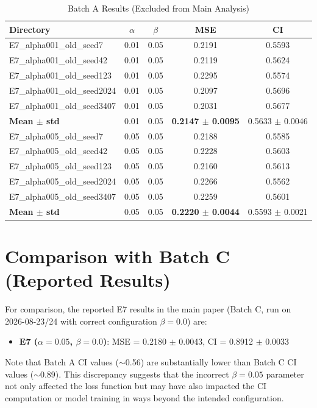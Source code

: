 \documentclass[10pt,a4paper]{article}
\begin{document}
\begin{table}[!h]
\centering
\caption{Batch A Results (Excluded from Main Analysis)}
\label{tab:batch_a}
\begin{tabular}{lcccc}
\hline
\textbf{Directory} & \textbf{$\alpha$} & \textbf{$\beta$} & \textbf{MSE} & \textbf{CI} \\
\hline
E7\_alpha001\_old\_seed7 & 0.01 & 0.05 & 0.2191 & 0.5593 \\
E7\_alpha001\_old\_seed42 & 0.01 & 0.05 & 0.2119 & 0.5624 \\
E7\_alpha001\_old\_seed123 & 0.01 & 0.05 & 0.2295 & 0.5574 \\
E7\_alpha001\_old\_seed2024 & 0.01 & 0.05 & 0.2097 & 0.5696 \\
E7\_alpha001\_old\_seed3407 & 0.01 & 0.05 & 0.2031 & 0.5677 \\
\hline
\textbf{Mean $\pm$ std} & 0.01 & 0.05 & \textbf{0.2147 $\pm$ 0.0095} & 0.5633 $\pm$ 0.0046 \\
\hline
E7\_alpha005\_old\_seed7 & 0.05 & 0.05 & 0.2188 & 0.5585 \\
E7\_alpha005\_old\_seed42 & 0.05 & 0.05 & 0.2228 & 0.5603 \\
E7\_alpha005\_old\_seed123 & 0.05 & 0.05 & 0.2160 & 0.5613 \\
E7\_alpha005\_old\_seed2024 & 0.05 & 0.05 & 0.2266 & 0.5562 \\
E7\_alpha005\_old\_seed3407 & 0.05 & 0.05 & 0.2259 & 0.5601 \\
\hline
\textbf{Mean $\pm$ std} & 0.05 & 0.05 & \textbf{0.2220 $\pm$ 0.0044} & 0.5593 $\pm$ 0.0021 \\
\hline
\end{tabular}
\end{table}

\section{Comparison with Batch C (Reported Results)}

For comparison, the reported E7 results in the main paper (Batch C, run on 2026-08-23/24 with correct configuration $\beta=0.0$) are:
\begin{itemize}
\item \textbf{E7 ($\alpha=0.05$, $\beta=0.0$)}: MSE = 0.2180 $\pm$ 0.0043, CI = 0.8912 $\pm$ 0.0033
\end{itemize}

Note that Batch A CI values ($\sim$0.56) are substantially lower than Batch C CI values ($\sim$0.89). This discrepancy suggests that the incorrect $\beta=0.05$ parameter not only affected the loss function but may have also impacted the CI computation or model training in ways beyond the intended configuration.
\end{document}
